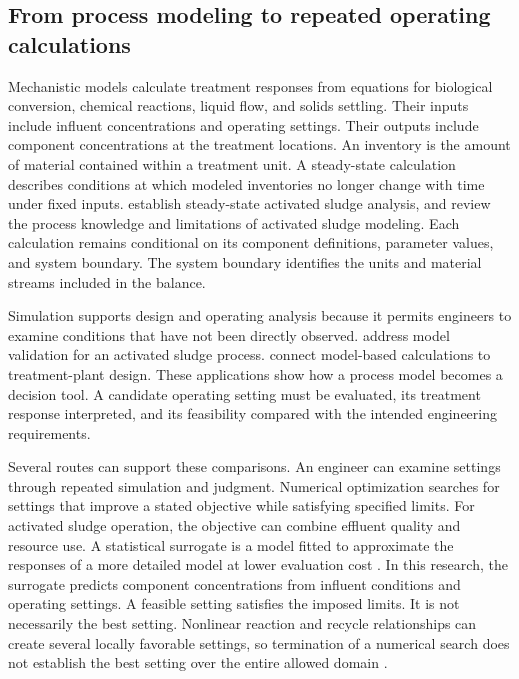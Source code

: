 \subsection{From process modeling to repeated operating calculations}

Mechanistic models calculate treatment responses from equations for biological conversion, chemical reactions, liquid flow, and solids settling. Their inputs include influent concentrations and operating settings. Their outputs include component concentrations at the treatment locations. An inventory is the amount of material contained within a treatment unit. A steady-state calculation describes conditions at which modeled inventories no longer change with time under fixed inputs. \citet{Marais1976} establish steady-state activated sludge analysis, and \citet{Hauduc2013} review the process knowledge and limitations of activated sludge modeling. Each calculation remains conditional on its component definitions, parameter values, and system boundary. The system boundary identifies the units and material streams included in the balance.

Simulation supports design and operating analysis because it permits engineers to examine conditions that have not been directly observed. \citet{Calise2020} address model validation for an activated sludge process. \citet{Rivas2008} connect model-based calculations to treatment-plant design. These applications show how a process model becomes a decision tool. A candidate operating setting must be evaluated, its treatment response interpreted, and its feasibility compared with the intended engineering requirements.

Several routes can support these comparisons. An engineer can examine settings through repeated simulation and judgment. Numerical optimization searches for settings that improve a stated objective while satisfying specified limits. For activated sludge operation, the objective can combine effluent quality and resource use. A statistical surrogate is a model fitted to approximate the responses of a more detailed model at lower evaluation cost \citep{BhosekarIerapetritou2018,McBride2019}. In this research, the surrogate predicts component concentrations from influent conditions and operating settings. A feasible setting satisfies the imposed limits. It is not necessarily the best setting. Nonlinear reaction and recycle relationships can create several locally favorable settings, so termination of a numerical search does not establish the best setting over the entire allowed domain \citep{Araujo2013,BuzziFerraris2013}.

